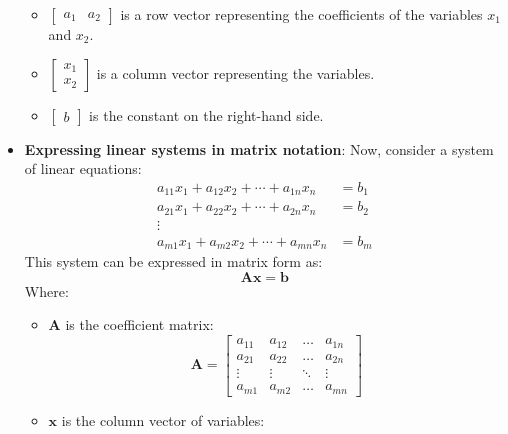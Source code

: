 \documentclass{report}
\begin{document}
\begin{itemize}
\begin{itemize}
                 \item \(\begin{bmatrix} a_1 & a_2 \end{bmatrix}\) is a row vector representing the coefficients of the variables \(x_1\) and \(x_2\).
                 \item \(\begin{bmatrix} x_1 \\ x_2 \end{bmatrix}\) is a column vector representing the variables.
                 \item \(\begin{bmatrix} b \end{bmatrix}\) is the constant on the right-hand side.
             \end{itemize}
         \item \textbf{Expressing linear systems in matrix notation}:
             Now, consider a system of linear equations:
             \[
                 \begin{aligned}
                     a_{11}x_1 + a_{12}x_2 + \cdots + a_{1n}x_n &= b_1 \\
                     a_{21}x_1 + a_{22}x_2 + \cdots + a_{2n}x_n &= b_2 \\
                     \vdots \\
                     a_{m1}x_1 + a_{m2}x_2 + \cdots + a_{mn}x_n &= b_m
                 \end{aligned}
             \]
             This system can be expressed in matrix form as:
             \[
                 \mathbf{A}\mathbf{x} = \mathbf{b}
             \]
             Where:
             \begin{itemize}
                 \item \(\mathbf{A}\) is the coefficient matrix:
                     \[
                         \mathbf{A} = 
                         \begin{bmatrix}
                             a_{11} & a_{12} & \dots & a_{1n} \\
                             a_{21} & a_{22} & \dots & a_{2n} \\
                             \vdots & \vdots & \ddots & \vdots \\
                             a_{m1} & a_{m2} & \dots & a_{mn}
                         \end{bmatrix}
                     \]
                 \item \(\mathbf{x}\) is the column vector of variables:

\end{itemize}
\end{itemize}
\end{document}
